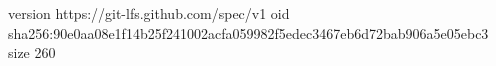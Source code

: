 version https://git-lfs.github.com/spec/v1
oid sha256:90e0aa08e1f14b25f241002acfa059982f5edec3467eb6d72bab906a5e05ebc3
size 260
